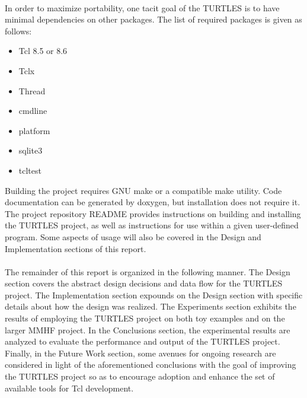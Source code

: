 \documentclass{article}[letter,10pt]
\begin{document}
{  \paragraph{}{
    In order to maximize portability, one tacit goal of the TURTLES is to have
    minimal dependencies on other packages. The list of required packages is
    given as follows:
    \begin{itemize}
    \item{Tcl 8.5\autocite{tcl::85} or 8.6\autocite{tcl::86}}
    \item{Tclx\autocite{tcl::Tclx}}
    \item{Thread\autocite{tcl::Thread}}
    \item{cmdline\autocite{tcl::cmdline}}
    \item{platform\autocite{tcl::platform}}
    \item{sqlite3\autocite{tcl::sqlite3}}
    \item{tcltest\autocite{tcl::tcltest}}
    \end{itemize}
    Building the project requires GNU make or a compatible make utility.
    Code documentation can be generated by doxygen, but installation does
    not require it. The project repository README provides instructions
    on building and installing the TURTLES project, as well as instructions
    for use within a given user-defined program. Some aspects of usage
    will also be covered in the Design and Implementation sections of
    this report.
  }
  \paragraph{}{
    The remainder of this report is organized in the following manner.
    The Design section covers the abstract design decisions and data flow
    for the TURTLES project. The Implementation section expounds on the
    Design section with specific details about how the design was realized.
    The Experiments section exhibits the results of employing the TURTLES
    project on both toy examples and on the larger MMHF project.
    In the Conclusions section, the experimental results are analyzed
    to evaluate the performance and output of the TURTLES project.
    Finally, in the Future Work section, some avenues for ongoing research
    are considered in light of the aforementioned conclusions with the goal of
    improving the TURTLES project so as to encourage adoption and enhance
    the set of available tools for Tcl development.
  }
}
\end{document}
